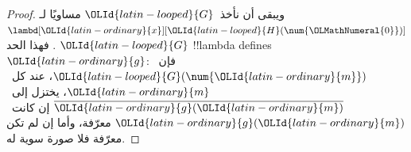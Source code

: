 \documentclass[../../../include/open-logic-section]{subfiles}
\begin{document}
\begin{proof}
ويبقى أن نأخذ~${\OLId{latin-looped}{G}}$ مساويًا لـ$\lambd[{\OLId{latin-ordinary}{x}}][{\OLId{latin-looped}{H}}(\num {\OLMathNumeral{0}})]$. فهذا الحد
${\OLId{latin-looped}{G}}$ !!{lambda define}s~${\OLId{latin-ordinary}{g}}$: فإن~${\OLId{latin-looped}{G}}(\num {\OLId{latin-ordinary}{m}})$، عند كل~${\OLId{latin-ordinary}{m}}$،
يختزل إلى~$\overline {{\OLId{latin-ordinary}{g}}({\OLId{latin-ordinary}{m}})}$ إن كانت~${\OLId{latin-ordinary}{g}}({\OLId{latin-ordinary}{m}})$ معرّفة، وأما إن لم تكن معرّفة فلا صورة سوية له.
\end{proof}
\end{document}
